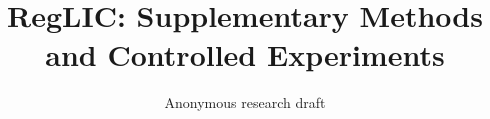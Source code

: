\documentclass[10pt,twocolumn,letterpaper]{article}
\title{RegLIC: Supplementary Methods and Controlled Experiments}
\author{Anonymous research draft}
\begin{document}
\raggedbottom
\maketitle

\clearpage
{\small}
\end{document}
